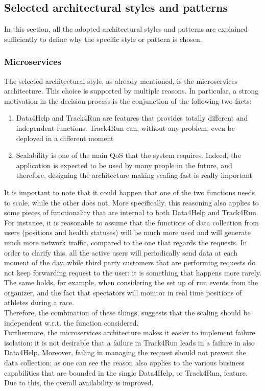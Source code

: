 \subsection{Selected architectural styles and patterns}
In this section, all the adopted architectural styles and patterns are explained sufficiently to define why the specific style or pattern is chosen.

\subsubsection{Microservices}
The selected architectural style, as already mentioned, is the microservices architecture. This choice is
supported by multiple reasons. In particular, a strong motivation in the decision process is the
conjunction of the following two facts:
\begin{enumerate}
\item Data4Help and Track4Run are features that provides totally different and independent functions.
Track4Run can, without any problem, even be deployed in a different moment
\item Scalability is one of the main QoS that the system requires. Indeed, the application is expected to
be used by many people in the future, and therefore, designing the architecture making scaling fast is
really important
\end{enumerate}
It is important to note that it could happen that one of the two functions needs to scale, while
the other does not. 
More specifically, this reasoning also applies to some pieces of functionality that
are internal to both Data4Help and Track4Run. 
For instance, it is reasonable to assume that the functions of data collection from users (positions and
health statuses) will be much more used and will generate much more network traffic, compared to the one
that regards the requests. 
In order to clarify this, all the active users will periodically send data at each moment of the day,
while third party customers that are performing requests do not keep forwarding request to the user: it is
something that happens more rarely. 
The same holds, for example, when considering the set up of run events from the organizer, and the fact
that spectators will monitor in real time positions of athletes during a race. \\ 
Therefore, the combination of these things, suggests that the scaling should be independent w.r.t. the
function considered. \\
Furthermore, the microservices architecture makes it easier to implement failure isolation: it is not
desirable that a failure in Track4Run leads in a failure in also Data4Help. 
Moreover, failing in managing the request should not prevent the data collection: as one can see the
reason also applies to the various business capabilities that are bounded in the single Data4Help, or
Track4Run, feature.  
Due to this, the overall availability is improved. 

